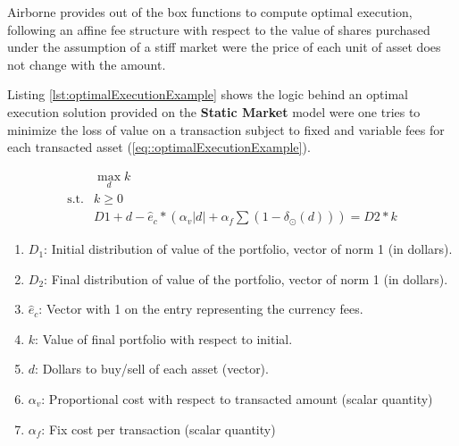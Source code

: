 Airborne provides out of the box functions to compute optimal execution, following an affine fee structure with respect to the value of shares purchased under the assumption of a stiff market were the price of each unit of asset does not change with the amount.

Listing \ref{lst:optimalExecutionExample} shows the logic behind an optimal execution solution provided on the \textbf{Static Market} model were one tries to minimize the loss of value on a transaction subject to fixed and variable fees for each transacted asset (\ref{eq::optimalExecutionExample}).



\begin{equation}
\label{eq::optimalExecutionExample}  
\begin{aligned}
& \max_{d} k   \\
\text{s.t.} & k\geq 0 \\
& D1 + d  - \hat{e}_{c} * \left(\alpha_v |d| + \alpha_f \sum{(1-\delta_{\odot}(d))}  \right) = D2 * k
\end{aligned}
\end{equation}

\begin{enumerate}
    \item $D_1$: Initial distribution of value of the portfolio, vector of norm 1 (in dollars).
    \item $D_2$: Final distribution of value of the portfolio, vector of norm 1 (in dollars).
    \item $\hat{e}_{c}$: Vector with 1 on the entry representing the currency fees.
    \item $k$: Value of final portfolio with respect to initial.
    \item $d$: Dollars to buy/sell of each asset (vector).
    \item $\alpha_v$: Proportional cost with respect to transacted amount (scalar quantity)
    \item $\alpha_f$: Fix cost per transaction (scalar quantity)
\end{enumerate}

